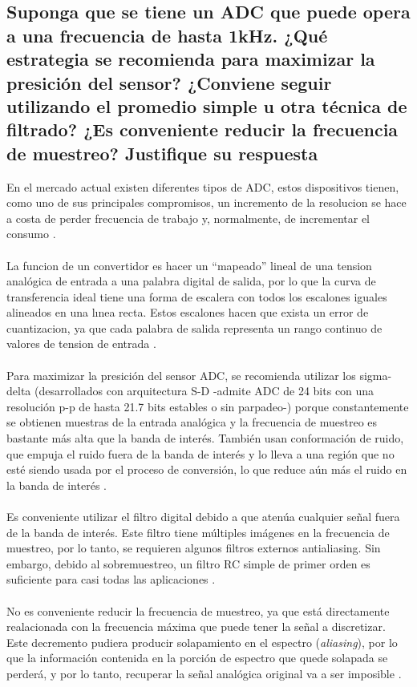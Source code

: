 \documentclass[letterpaper,10.5pt]{article} %
\begin{document}
		\subsection{Suponga que se tiene un ADC que puede opera a una frecuencia de hasta 1kHz. ¿Qué estrategia se recomienda para maximizar la presición del sensor? ¿Conviene seguir utilizando el promedio simple u otra técnica de filtrado? ¿Es conveniente reducir la frecuencia de muestreo? Justifique su respuesta}
		En el mercado actual existen diferentes tipos de ADC, estos dispositivos tienen, como uno de sus principales compromisos, un incremento de la resolucion se hace a costa de perder frecuencia de trabajo y, normalmente, de incrementar el consumo \cite{lozano2017estudio}.\\ \\
		La funcion de un convertidor es hacer un ``mapeado'' lineal de una tension analógica de entrada a una palabra digital de salida, por lo que la curva de transferencia ideal tiene una forma de escalera con todos los escalones iguales alineados en una lınea recta. Estos escalones hacen que exista un error de cuantizacion, ya que cada palabra de salida representa un rango continuo de valores de tension de entrada \cite{lozano2017estudio}.\\ \\
		Para maximizar la presición del sensor ADC, se recomienda utilizar los sigma-delta (desarrollados con arquitectura S-D -admite ADC de 24 bits con una resolución p-p de hasta 21.7 bits estables o sin parpadeo-) porque constantemente se obtienen muestras de la entrada analógica y la frecuencia de muestreo es bastante más alta que la banda de interés. También usan conformación de ruido, que empuja el ruido fuera de la banda de interés y lo lleva a una región que no esté siendo usada por el proceso de conversión, lo que reduce aún más el ruido en la banda de interés \cite{ADC_sigma}.\\ \\
		Es conveniente utilizar el filtro digital debido a que atenúa cualquier señal fuera de la banda de interés. Este filtro tiene múltiples imágenes en la frecuencia de muestreo, por lo tanto, se requieren algunos filtros externos antialiasing. Sin embargo, debido al sobremuestreo, un filtro RC simple de primer orden es suficiente para casi todas las aplicaciones \cite{ADC_sigma}. \\ \\
		No es conveniente reducir la frecuencia de muestreo, ya que está directamente realacionada con la frecuencia máxima que puede tener la señal a discretizar. Este decremento pudiera producir solapamiento en el espectro (\emph{aliasing}), por lo que la información contenida en la porción de espectro que quede solapada se perderá, y por lo tanto, recuperar la señal analógica original va a ser imposible \cite{bueno2013diseno}.

	\hfill \break %
	
\end{document}
